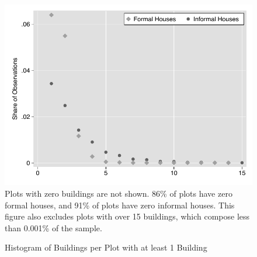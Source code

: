 \documentclass[12pt]{article}
\begin{document}
\begin{figure}[hbt!]
      {  \centering
   \caption[ Histogram of Buildings per Plot with at least 1 Building ]
    {\small Histogram of Buildings per Plot with at least 1 Building }\label{figure:buildhist} 
\includegraphics[width=\textwidth,trim={0.3cm .3cm 0.1cm 0cm}, clip=true]{figures/building_hist.pdf}
Plots with zero buildings are not shown.  86\% of plots have zero formal houses, and 91\% of plots have zero informal houses.
This figure also excludes plots with over 15 buildings, which compose less than 0.001\% of the sample.
}
\end{figure}
\end{document}
